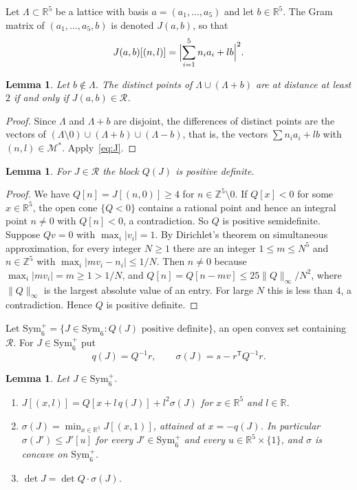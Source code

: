 \documentclass[11pt]{amsart}
\newtheorem{lemma}[theorem]{Lemma}
\theoremstyle{definition}
\theoremstyle{remark}
\numberwithin{equation}{section}
\numberwithin{table}{section}
\numberwithin{figure}{section}
\newcommand{\R}{\mathbb{R}}
\newcommand{\Z}{\mathbb{Z}}
\newcommand{\M}{\mathcal{M}}
\newcommand{\Rk}{\mathcal{R}}
\newcommand{\Sym}{\mathrm{Sym}}
\newcommand{\T}{\mathsf{T}}
\begin{document}
Let $\Lambda\subset\R^5$ be a lattice with basis $a=(a_1,\dots,a_5)$ and let $b\in\R^5$. The Gram matrix of $(a_1,\dots,a_5,b)$ is denoted $J(a,b)$, so that
\begin{equation}\label{eq:J}
J(a,b)[(n,l)]=\Bigl|\sum_{i=1}^5 n_ia_i+lb\Bigr|^2 .
\end{equation}

\begin{lemma}\label{lem:packing}
Let $b\notin\Lambda$. The distinct points of $\Lambda\cup(\Lambda+b)$ are at distance at least $2$ if and only if $J(a,b)\in\Rk$.
\end{lemma}

\begin{proof}
Since $\Lambda$ and $\Lambda+b$ are disjoint, the differences of distinct points are the vectors of $(\Lambda\setminus0)\cup(\Lambda+b)\cup(\Lambda-b)$, that is, the vectors $\sum n_ia_i+lb$ with $(n,l)\in\M^*$. Apply~\eqref{eq:J}.
\end{proof}

\begin{lemma}\label{lem:pd}
For $J\in\Rk$ the block $Q(J)$ is positive definite.
\end{lemma}

\begin{proof}
We have $Q[n]=J[(n,0)]\ge4$ for $n\in\Z^5\setminus0$. If $Q[x]<0$ for some $x\in\R^5$, the open cone $\{Q<0\}$ contains a rational point and hence an integral point $n\ne0$ with $Q[n]<0$, a contradiction. So $Q$ is positive semidefinite. Suppose $Qv=0$ with $\max_i|v_i|=1$. By Dirichlet's theorem on simultaneous approximation, for every integer $N\ge1$ there are an integer $1\le m\le N^5$ and $n\in\Z^5$ with $\max_i|mv_i-n_i|\le1/N$. Then $n\ne0$ because $\max_i|mv_i|=m\ge1>1/N$, and $Q[n]=Q[n-mv]\le25\|Q\|_{\infty}/N^2$, where $\|Q\|_\infty$ is the largest absolute value of an entry. For large $N$ this is less than $4$, a contradiction. Hence $Q$ is positive definite.
\end{proof}

Let $\Sym_6^+=\{J\in\Sym_6:Q(J)\text{ positive definite}\}$, an open convex set containing $\Rk$. For $J\in\Sym_6^+$ put
\[
q(J)=Q^{-1}r,\qquad \sigma(J)=s-r^\T Q^{-1}r .
\]

\begin{lemma}\label{lem:sigma}
Let $J\in\Sym_6^+$.
\begin{enumerate}
\item $J[(x,l)]=Q[x+l\,q(J)]+l^2\sigma(J)$ for $x\in\R^5$ and $l\in\R$.
\item $\sigma(J)=\min_{x\in\R^5}J[(x,1)]$, attained at $x=-q(J)$. In particular $\sigma(J')\le J'[u]$ for every $J'\in\Sym_6^+$ and every $u\in\R^5\times\{1\}$, and $\sigma$ is concave on $\Sym_6^+$.
\item $\det J=\det Q\cdot\sigma(J)$.
\end{enumerate}
\end{lemma}
\end{document}
